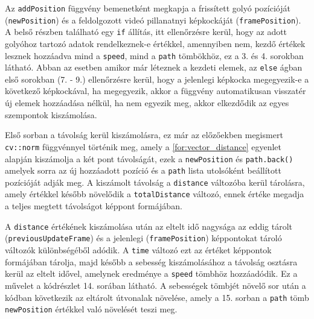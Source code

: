 \par Az \lstinline{addPosition} függvény bemenetként megkapja a frissített golyó pozícióját (\lstinline{newPosition}) és a feldolgozott videó pillanatnyi képkockáját (\lstinline{framePosition}). A belső részben található egy \lstinline{if} állítás, itt ellenőrzésre kerül, hogy az adott golyóhoz tartozó adatok rendelkeznek-e értékkel, amennyiben nem, kezdő értékek lesznek hozzáadva mind a \lstinline{speed}, mind a \lstinline{path} tömbökhöz, ez a 3. és 4. sorokban látható. Abban az esetben amikor már léteznek a kezdeti elemek, az \lstinline{else} ágban első sorokban (7. - 9.) ellenőrzésre kerül, hogy a jelenlegi képkocka megegyezik-e a következő képkockával, ha megegyezik, akkor a függvény automatikusan visszatér új elemek hozzáadása nélkül, ha nem egyezik meg, akkor elkezdődik az egyes szempontok kiszámolása.
\par Első sorban a távolság kerül kiszámolásra, ez már az előzőekben megismert \lstinline{cv::norm} függvénnyel\cite{opencv_docs} történik meg, amely a \ref{for:vector_distance} egyenlet alapján kiszámolja a két pont távolságát, ezek a \lstinline{newPosition} és \lstinline{path.back()} amelyek sorra az új hozzáadott pozíció és a \lstinline{path} lista utolsóként beállított pozícióját adják meg. A kiszámolt távolság a \lstinline{distance} változóba kerül tárolásra, amely értékkel később növelődik a \lstinline{totalDistance} változó, ennek értéke megadja a teljes megtett távolságot képpont formájában.
\par A \lstinline{distance} értékének kiszámolása után az eltelt idő nagysága az eddig tárolt (\lstinline{previousUpdateFrame}) és a jelenlegi (\lstinline{framePosition}) képpontokat tároló változók különbségéből adódik. A \lstinline{time} változó ezt az értéket képpontok formájában tárolja, majd később a sebesség kiszámolásához a távolság osztásra kerül az eltelt idővel, amelynek eredménye a \lstinline{speed} tömbhöz hozzáadódik. Ez a művelet a kódrészlet 14. sorában látható. A sebességek tömbjét növelő sor után a kódban következik az eltárolt útvonalak növelése, amely a 15. sorban a \lstinline{path} tömb \lstinline{newPosition} értékkel való növelését teszi meg.